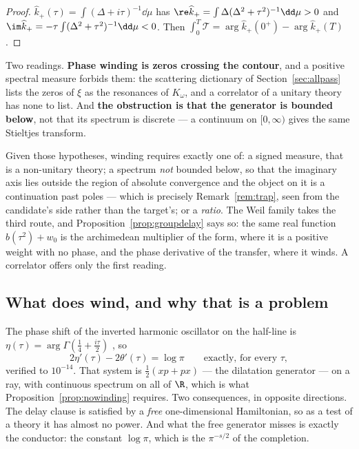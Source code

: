 \begin{proof}
$\widehat k_+(\tau)=\int(\Delta+i\tau)^{-1}\dd\mu$ has
$\re\widehat k_+=\int\Delta(\Delta^2+\tau^2)^{-1}\dd\mu>0$ and
$\im\widehat k_+=-\tau\int(\Delta^2+\tau^2)^{-1}\dd\mu<0$. Then
$\int_0^T\mathcal T=\arg\widehat k_+(0^+)-\arg\widehat k_+(T)$.
\end{proof}

Two readings. \textbf{Phase winding is zeros crossing the contour}, and a positive
spectral measure forbids them: the scattering dictionary of
Section~\ref{sec:allpass} lists the zeros of $\xi$ as the resonances of
$K_\omega$, and a correlator of a unitary theory has none to list. And
\textbf{the obstruction is that the generator is bounded below}, not that its
spectrum is discrete --- a continuum on $[0,\infty)$ gives the same Stieltjes
transform.

\begin{remark}\label{rem:escapes}
Given those hypotheses, winding requires exactly one of: a signed measure, that
is a non-unitary theory; a spectrum \emph{not} bounded below, so that the
imaginary axis lies outside the region of absolute convergence and the object on
it is a continuation past poles --- which is precisely
Remark~\ref{rem:trap}, seen from the candidate's side rather than the target's;
or a \emph{ratio}. The Weil family takes the third route, and
Proposition~\ref{prop:groupdelay} says so: the same real function
$b(\tau^2)+w_0$ is the archimedean multiplier of the form, where it is a positive
weight with no phase, and the phase derivative of the transfer, where it winds. A
correlator offers only the first reading.
\end{remark}

\subsection{What does wind, and why that is a problem}\label{ssec:winds}

The phase shift of the inverted harmonic oscillator on the half-line is
$\eta(\tau)=\arg\Gamma(\frac14+\frac{i\tau}2)$ \cite{BhaduriKhareLaw}, so
\begin{equation}\label{eq:freewinding}
 2\eta'(\tau)-2\theta'(\tau)=\log\pi\qquad\text{exactly, for every }\tau,
\end{equation}
verified to $10^{-14}$. That system is $\frac12(xp+px)$ --- the dilatation
generator --- on a ray, with continuous spectrum on all of $\R$, which is what
Proposition~\ref{prop:nowinding} requires. Two consequences, in opposite
directions. The delay clause is satisfied by a \emph{free} one-dimensional
Hamiltonian, so as a test of a theory it has almost no power. And what the free
generator misses is exactly the conductor: the constant $\log\pi$, which is the
$\pi^{-s/2}$ of the completion.

